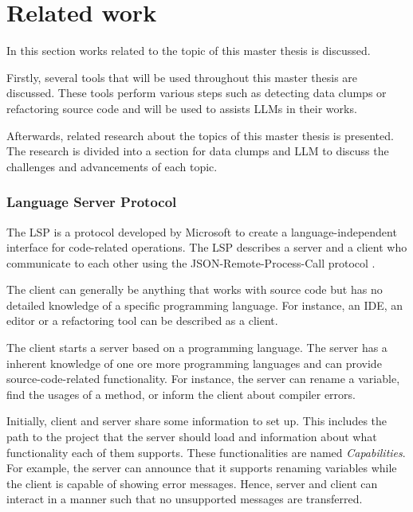 \section{Related work}\label{sec:related_research}
In this section works related to the topic of this master thesis is discussed. 

Firstly,  several tools that will be used throughout this master thesis are discussed. These tools perform various steps such as detecting data clumps or  refactoring source code and will be used to assists \acp{LLM} in their works.

Afterwards, related research about the topics of this master thesis is presented. The research is divided into a section for data clumps and \ac{LLM} to discuss the challenges and advancements of each topic. 


\subsubsection{Language Server Protocol} \label{sec:lsp}
The \ac{LSP}  \cite{lsp_website} is a protocol developed by Microsoft to create a language-independent interface for code-related operations. 
The \ac{LSP}  describes a server and a client who communicate to each other using the JSON-Remote-Process-Call protocol \cite{json_rpc}. 

The client can generally be anything that works with source code but has no detailed knowledge of a specific programming language. For instance, an \ac{IDE}, an editor or a refactoring tool can be described as a client.

The client starts a server based on a programming language. The server has a inherent knowledge of one ore more programming languages and can provide source-code-related functionality. For instance, the server can rename a variable, find the usages of a method, or inform the client about compiler errors. 

Initially, client and server share some information to set up. This includes the path to the project that the server should load and information about what functionality each of them supports. These functionalities are named \textit{Capabilities}. For example, the server can announce that it supports renaming variables while the client is capable of showing error messages. Hence, server and client can interact in a manner such that no unsupported messages are transferred.

